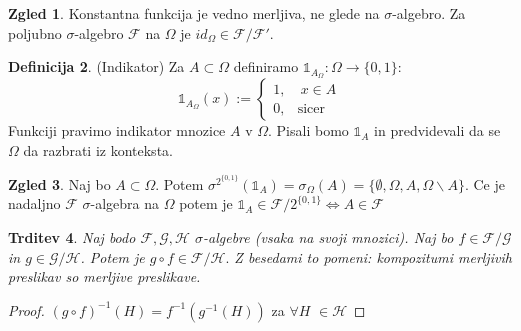 \documentclass[a4paper,12pt]{article}
\theoremstyle{definition} %
\newtheorem{definicija}{Definicija}[section]
\newtheorem{zgled}[definicija]{Zgled}
\theoremstyle{plain} %
\newtheorem{trditev}[definicija]{Trditev}
\newcommand{\F}{\mathcal{F}}
\begin{document}
            \begin{zgled}
                Konstantna funkcija je vedno merljiva, ne glede na $\sigma$-algebro. Za poljubno $\sigma$-algebro $\F$ na $\Omega$ je $id_\Omega \in \F/\F'$.
            \end{zgled}

            \begin{definicija}(Indikator)
                Za $A \subset \Omega$ definiramo $\mathds{1}_{A_\Omega}:\Omega\rightarrow\{0, 1\}$:
                $$\mathds{1}_{A_\Omega}(x) := 
                    \begin{cases}
                        1, & \ x \in A \\
                        0, & \text{sicer}
                    \end{cases}$$
                Funkciji pravimo indikator mnozice $A$ v $\Omega$. Pisali bomo $\mathds{1}_A$ in predvidevali da se $\Omega$ da razbrati iz konteksta.
            \end{definicija}

            \begin{zgled}
                Naj bo $A \subset \Omega$. Potem $\sigma^{2^{\{0, 1\}}}(\mathds{1}_A) = \sigma_\Omega (A) = \{\emptyset, \Omega, A, \Omega\backslash A\}$. Ce je nadaljno $\F$ $\sigma$-algebra na $\Omega$ potem je  $\mathds{1}_A \in \F/2^{\{0, 1\}} \iff A \in \F$ 
            \end{zgled}

            \begin{trditev}
                Naj bodo $\F, \mathcal{G}, \mathcal{H}$ $\sigma$-algebre (vsaka na svoji mnozici). Naj bo $f \in \F/\mathcal{G}$ in $g \in \mathcal{G}/\mathcal{H}$. Potem je $g \circ f \in \F/\mathcal{H}.$ Z besedami to pomeni: kompozitumi merljivih preslikav so merljive preslikave.
            \end{trditev}

            \begin{proof}
                $(g \circ f)^{-1}(H) = f^{-1}(g^{-1}(H))$ za $\forall H$ $\in \mathcal{H}$
            \end{proof}
\end{document}
